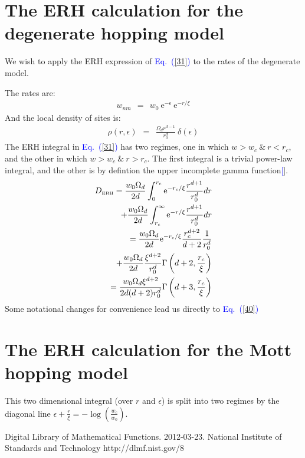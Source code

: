 \documentclass[aps,prb,floats,floatfix,twocolumn]{revtex4}
\newcommand{\eexp}{\mbox{e}^}
\newcommand{\tbox}[1]{\mbox{\tiny #1}}
\newcommand{\beq}{\begin{eqnarray}}
\newcommand{\eeq}{\end{eqnarray}}
\newcommand{\Eq}[1]{\textcolor{blue}{Eq.\!\!~(\ref{#1})}}
\renewcommand{\cite}[1]{\textcolor{blue}{[\onlinecite{#1}}]} %
\begin{document}
\appendix
\section{The ERH calculation for the degenerate hopping model}

We wish to apply the ERH expression of \Eq{31} 
to the rates of the degenerate model.

The rates are:
%
\beq
w_{nm} \ \ = \ \  w_0 \ \eexp{-\epsilon} \ \eexp{-r/\xi} 
\eeq
%
And the local density of sites is:
%
\beq
\rho(r,\epsilon) \ \ =\ \ \frac{\Omega_d r^{d-1}}{r_0^d} \ \delta (\epsilon)
\eeq
%
The ERH integral in \Eq{31} has two regimes, 
one in which $w>w_c \ \& \ r<r_c$, and the other in which $w>w_c\ \& \ r>r_c$.
The first integral is a trivial power-law integral, 
and the other is by defintion the upper incomplete gamma function\cite{dlmf_gamma}.
%
\beq
D_{\tbox{ERH}} = \frac{w_0\Omega_d}{2d}\int_0^{r_c} \eexp{-r_c / \xi} \frac{r^{d+1}}{r_0^d} dr \\
               + \frac{w_0\Omega_d}{2d}\int_{r_c}^\infty \eexp{-r / \xi} \frac{r^{d+1}}{r_0^d} dr \\
\ \ \ = \frac{w_0\Omega_d}{2d} \eexp{-r_c / \xi} \frac{r_c^{d+2}}{d+2} \frac{1}{r_0^d} \\
\ \ \  +\frac{w_0\Omega_d}{2d} \frac{\xi^{d+2}}{r_0^d} \Gamma\left(d+2,\frac{r_c}{\xi}\right)\\
\ \ \ = \frac{w_0\Omega_d \xi^{d+2}}{2d(d+2)r_0^d}\Gamma\left(d+3,\frac{r_c}{\xi}\right)
\eeq
%
Some notational changes for convenience lead us directly to \Eq{40} 


\section{The ERH calculation for the Mott hopping model}

This two dimensional integral (over $r$ and $\epsilon$) 
is split into two regimes by the diagonal line $\epsilon+\frac{r}{\xi} = -\log\left(\frac{w_c}{w_0}\right)$.






\begin{thebibliography}{99}
Digital Library of Mathematical Functions. 2012-03-23. National Institute of Standards and Technology  http://dlmf.nist.gov/8



\end{thebibliography}
\end{document}

